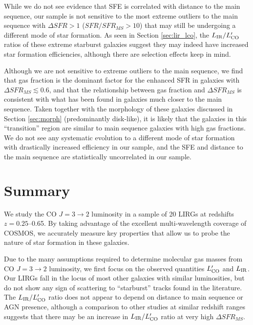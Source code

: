 \documentclass[a4paper,fleqn,usenatbib]{mnras}
\newcommand{\lir}{L_{\rm{IR}}}
\newcommand{\lco}{L'_{\rm{CO}}}
\begin{document}
While we do not see evidence that SFE is correlated with distance to the main sequence, our sample is not sensitive to the most extreme outliers to the main sequence with $\Delta SFR >1$  ($SFR/SFR_{MS} > 10$) that may still be undergoing a different mode of star formation. As seen in Section \ref{sec:lir_lco}, the $\lir / \lco$ ratios of these extreme starburst galaxies suggest they may indeed have increased star formation efficiencies, although there are selection effects keep in mind. 

Although we are not sensitive to extreme outliers to the main sequence, we find that gas fraction is the dominant factor for the enhanced SFR in galaxies with $\Delta SFR_{MS} \lesssim 0.6$, and that the relationship between gas fraction and $\Delta SFR_{MS}$ is consistent with what has been found in galaxies much closer to the main sequence. Taken together with the morphology of these galaxies discussed in Section \ref{sec:morph} (predominantly disk-like), it is likely that the galaxies in this ``transition'' region are similar to main sequence galaxies with high gas fractions.  We do not see any systematic evolution to a different mode of star formation with drastically increased efficiency in our sample, and the SFE and distance to the main sequence are statistically uncorrelated in our sample.  


\section{Summary}

We study the CO $J=3\rightarrow2$ luminosity in a sample of 20 LIRGs at redshifts $z = 0.25$--0.65. By taking advantage of the excellent multi-wavelength coverage of COSMOS, we accurately measure key properties that allow us to probe the nature of star formation in these galaxies. 

Due to the many assumptions required to determine molecular gas masses from CO $J=3\rightarrow2$ luminosity, we first focus on the observed quantities $\lco$ and $\lir$. Our LIRGs fall in the locus of most other galaxies with similar luminosities, but do not show any sign of scattering to ``starburst'' tracks found in the literature. The $\lir / \lco$ ratio does not appear to depend on distance to main sequence or AGN presence, although a comparison to other studies at similar redshift ranges suggests that there may be an increase in $\lir / \lco$ ratio at very high $\Delta SFR_{MS}$. 
\end{document}
